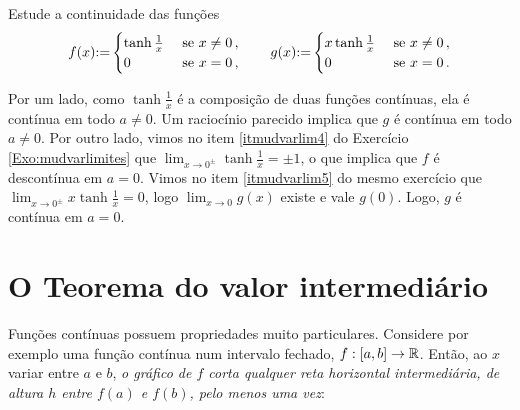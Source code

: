 \begin{exo}
Estude a continuidade das funções 
$$
f(x){:=}
\begin{cases}
\tanh \tfrac1x &\text{ se } x\neq 0\,,\\
0  & \text{ se } x=0\,,
\end{cases}
\quad\quad
g(x){:=}
\begin{cases}
x\tanh \tfrac1x &\text{ se } x\neq 0\,,\\
0  & \text{ se } x=0\,.
\end{cases}
$$
\begin{sol}
Por um lado, como $\tanh \tfrac1x$ é a composição de duas funções contínuas, ela é
contínua em todo $a\neq 0$.
Um raciocínio parecido implica que $g$ é contínua em todo $a\neq 0$.
Por outro lado, 
vimos no item \eqref{itmudvarlim4} do Exercício \ref{Exo:mudvarlimites} que $\lim_{x\to
0^{\pm}}\tanh \frac{1}{x}=\pm 1$, o que implica que $f$ é descontínua em $a=0$.
Vimos no item \eqref{itmudvarlim5} do mesmo exercício que $\lim_{x\to
0^{\pm}}x\tanh \frac{1}{x}=0$, logo $\lim_{x\to 0}g(x)$ existe e vale $g(0)$.
Logo, $g$ é contínua em $a=0$.
\begin{center}
\begin{bmlimage}\end{bmlimage}
\end{center}
\end{sol}
\end{exo}


\section{O Teorema do valor intermediário}
Funções contínuas possuem propriedades muito particulares.
Considere por exemplo
uma função contínua num intervalo fechado, $f:[a,b]\to \mathbb{R}$. 
Então, ao $x$ variar entre $a$ e $b$, \emph{o gráfico de $f$ corta 
qualquer reta horizontal
intermediária, de altura $h$ entre $f(a)$ e $f(b)$, pelo menos uma
vez}:

